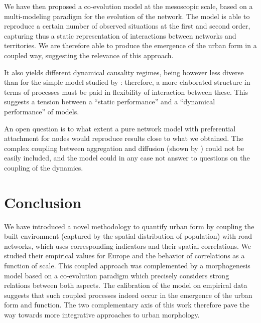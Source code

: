 We have then proposed a co-evolution model at the mesoscopic scale, based on a multi-modeling paradigm for the evolution of the network. The model is able to reproduce a certain number of observed situations at the first and second order, capturing thus a static representation of interactions between networks and territories. We are therefore able to produce the emergence of the urban form in a coupled way, suggesting the relevance of this approach.

It also yields different dynamical causality regimes, being however less diverse than  for the simple model studied by \cite{raimbault2017identification}: therefore, a more elaborated structure in terms of processes must be paid in flexibility of interaction between these. This suggests a tension between a ``static performance'' and a ``dynamical performance'' of models.


An open question is to what extent a pure network model with preferential attachment for nodes would reproduce results close to what we obtained. The complex coupling between aggregation and diffusion (shown by \cite{2017arXiv170806743R}) could not be easily included, and the model could in any case not answer to questions on the coupling of the dynamics.



\section*{Conclusion}


We have introduced a novel methodology to quantify urban form by coupling the built environment (captured by the spatial distribution of population) with road networks, which uses corresponding indicators and their spatial correlations. We studied their empirical values for Europe and the behavior of correlations as a function of scale. This coupled approach was complemented by a morphogenesis model based on a co-evolution paradigm which precisely considers strong relations between both aspects. The calibration of the model on empirical data suggests that such coupled processes indeed occur in the emergence of the urban form and function. The two complementary axis of this work therefore pave the way towards more integrative approaches to urban morphology.


